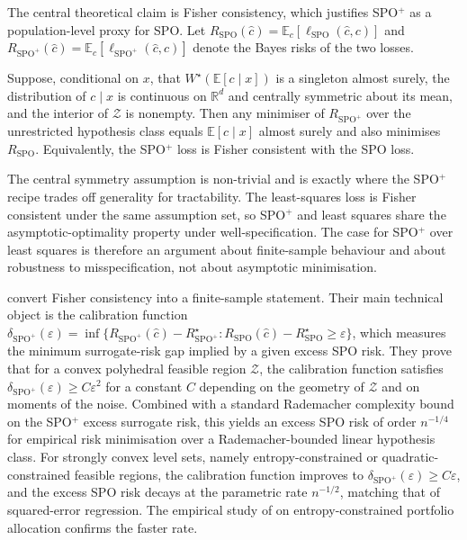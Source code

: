 The central theoretical claim is Fisher consistency, which justifies SPO$^+$ as
a population-level proxy for SPO. Let
$R_{\mathrm{SPO}}(\hat c) = \mathbb E_c [\ell_{\mathrm{SPO}}(\hat c, c)]$ and
$R_{\mathrm{SPO}^+}(\hat c) = \mathbb E_c [\ell_{\mathrm{SPO}^+}(\hat c, c)]$
denote the Bayes risks of the two losses.

\begin{theorem}
\label{thm:spo_fisher}
Suppose, conditional on $x$, that $W^\star(\mathbb E[c \mid x])$ is a singleton
almost surely, the distribution of $c \mid x$ is continuous on $\mathbb R^d$ and
centrally symmetric about its mean, and the interior of $\mathcal Z$ is nonempty.
Then any minimiser of $R_{\mathrm{SPO}^+}$ over the unrestricted hypothesis class
equals $\mathbb E[c \mid x]$ almost surely and also minimises $R_{\mathrm{SPO}}$.
Equivalently, the SPO$^+$ loss is Fisher consistent with the SPO loss.
\end{theorem}

The central symmetry assumption is non-trivial and is exactly where the SPO$^+$
recipe trades off generality for tractability. The least-squares loss is Fisher
consistent under the same assumption set, so SPO$^+$ and least squares share the
asymptotic-optimality property under well-specification. The case for SPO$^+$
over least squares is therefore an argument about finite-sample behaviour and
about robustness to misspecification, not about asymptotic minimisation.

\citet{LiuGrigas2021} convert Fisher consistency into a finite-sample statement.
Their main technical object is the calibration function
$\delta_{\mathrm{SPO}^+}(\varepsilon)
= \inf \bigl\{ R_{\mathrm{SPO}^+}(\hat c) - R_{\mathrm{SPO}^+}^\star
  : R_{\mathrm{SPO}}(\hat c) - R_{\mathrm{SPO}}^\star \ge \varepsilon \bigr\}$,
which measures the minimum surrogate-risk gap implied by a given excess SPO risk.
They prove that for a convex polyhedral feasible region $\mathcal Z$, the
calibration function satisfies $\delta_{\mathrm{SPO}^+}(\varepsilon) \ge C
\varepsilon^2$ for a constant $C$ depending on the geometry of $\mathcal Z$ and on
moments of the noise. Combined with a standard Rademacher complexity bound on the
SPO$^+$ excess surrogate risk, this yields an excess SPO risk of order $n^{-1/4}$
for empirical risk minimisation over a Rademacher-bounded linear hypothesis class.
For strongly convex level sets, namely entropy-constrained or quadratic-constrained
feasible regions, the calibration function improves to $\delta_{\mathrm{SPO}^+}
(\varepsilon) \ge C \varepsilon$, and the excess SPO risk decays at the parametric
rate $n^{-1/2}$, matching that of squared-error regression. The empirical study
of \citet{LiuGrigas2021} on entropy-constrained portfolio allocation confirms the
faster rate.

